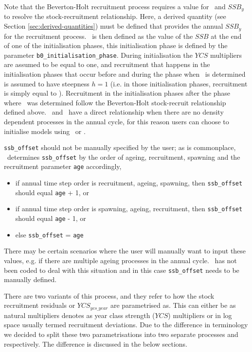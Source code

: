 Note that the Beverton-Holt recruitment process requires a value for \Bzero\ and $SSB_y$ to resolve the stock-recruitment relationship. Here, a derived quantity (see Section \ref{sec:derived-quantities}) must be defined that provides the annual $SSB_y$ for the recruitment process. \Bzero\ is then defined as the value of the $SSB$ at the end of one of the initialisation phases, this initialisation phase is defined by the parameter \texttt{b0\_initialisation\_phase}. During initialisation the $YCS$ multipliers are assumed to be equal to one, and recruitment that happens in the initialisation phases that occur before and during the phase when \Bzero\ is determined is assumed to have steepness $h=1$ (i.e. in those initialisation phases, recruitment is simply equal to \Rzero). Recruitment in the initialisation phases after the phase where \Bzero\ was determined follow the Beverton-Holt stock-recruit relationship defined above. \Rzero\ and \Bzero\ have a direct relationship when there are no density dependent processes in the annual cycle, for this reason users can choose to initialise models using \Bzero\ or \Rzero.

\texttt{ssb\_offset} should not be manually specified by the user; as is commonplace, \CNAME\ determines \texttt{ssb\_offset} by the order of ageing, recruitment, spawning and the recruitment parameter \texttt{age} accordingly,
\begin{itemize}
	\item if annual time step order is recruitment, ageing, spawning, then \texttt{ssb\_offset} should equal \texttt{age} + 1, or
	\item if annual time step order is spawning, ageing, recruitment, then \texttt{ssb\_offset} should equal \texttt{age} - 1, or
	\item else \texttt{ssb\_offset} = \texttt{age}
\end{itemize}

There may be certain scenarios where the user will manually want to input these values, e.g. if there are multiple ageing processes in the annual cycle. \CNAME\ has not been coded to deal with this situation and in this case \texttt{ssb\_offset} needs to be manually defined.

There are two variants of this process, and they refer to how the stock recruitment residuals or $YCS_{ycs\_year}$ are parametrised as. This can either be as natural multipliers denotes as year class strength ($YCS$) multipliers or in log space usually termed recruitment deviations. Due to the difference in terminology we decided to split these two parametrisations into two separate processes  and  respectively. The difference is discussed in the below sections.

